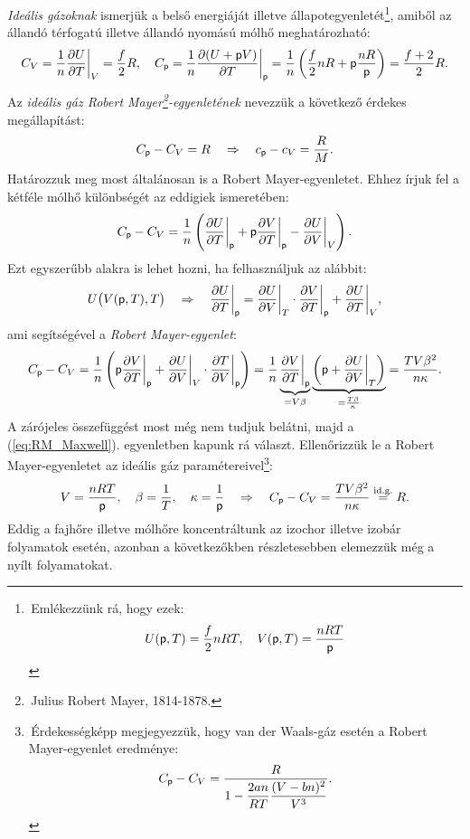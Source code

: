 \emph{Ideális gázoknak} ismerjük a belső energiáját illetve állapotegyenletét\footnote{\,Emlékezzünk rá, hogy ezek:\begin{align}
    U(\mathsf p,T) = \frac f2 nRT,\quad V(\mathsf p,T) = \frac{nRT}{\mathsf p}
\end{align}}, amiből az állandó térfogatú illetve állandó nyomású mólhő meghatározható:
\begin{align}\label{eq:cv_cp}
    C_V = \frac{1}{n} \frac{\partial{U}}{\partial{T}}\bigg|_V = \frac f2 R,\quad C_\mathsf p = \frac{1}{n} \frac{\partial{(U+\mathsf pV)}}{\partial{T}}\bigg|_\mathsf p = \frac{1}{n}\left({\frac f2 nR+ \mathsf p\frac{nR}{\mathsf p}}\right) = \frac{f+2}{2}R.
\end{align} 
Az \emph{ideális gáz Robert Mayer\footnote{\,Julius Robert Mayer, 1814-1878.}-egyenletének} nevezzük a következő érdekes megállapítást:
\begin{align}
    C_\mathsf p - C_V =R \quad\Rightarrow\quad c_\mathsf p - c_V = \frac RM.
\end{align}
Határozzuk meg most általánosan is a Robert Mayer-egyenletet.
Ehhez írjuk fel a kétféle mólhő különbségét az eddigiek ismeretében:
\begin{align}
    C_\mathsf p - C_V = \frac{1}{n}\left({\frac{\partial{U}}{\partial{T}}\bigg|_\mathsf p + \mathsf p \frac{\partial{V}}{\partial{T}}\bigg|_\mathsf p - \frac{\partial{U}}{\partial{V}}\bigg|_V}\right).
\end{align}
Ezt egyszerűbb alakra is lehet hozni, ha felhasználjuk az alábbit:
\begin{align}
    U\big(V(\mathsf p,T),T \big) \quad\Rightarrow\quad \frac{\partial{U}}{\partial{T}}\bigg|_\mathsf p = \frac{\partial{U}}{\partial{V}}\bigg|_T\cdot\frac{\partial{V}}{\partial{T}}\bigg|_\mathsf p + \frac{\partial{U}}{\partial{T}}\bigg|_V,
\end{align}
ami segítségével a \emph{Robert Mayer-egyenlet}:
\begin{align}\label{eq:RM}
    C_\mathsf p -C_V = \frac{1}{n}\left({\mathsf p\frac{\partial{V}}{\partial{T}}\bigg|_\mathsf p + \frac{\partial{U}}{\partial{V}}\bigg|_V\cdot \frac{\partial{T}}{\partial{V}}\bigg|_\mathsf p}\right) = \frac{1}{n}\underbrace{\frac{\partial{V}}{\partial{T}}\bigg|_\mathsf p}_{=V\beta} \underbrace{\left({\mathsf p + \frac{\partial{U}}{\partial{V}}\bigg|_T}\right)}_{=\frac{T\beta}{\kappa}} = \frac{T V \beta^2}{n\kappa}.
\end{align}
A zárójeles összefüggést most még nem tudjuk belátni, majd a (\ref{eq:RM_Maxwell}). egyenletben kapunk rá választ. Ellenőrizzük le a Robert Mayer-egyenletet az ideális gáz paramétereivel\footnote{\,Érdekességképp megjegyezzük, hogy van der Waals-gáz esetén a Robert Mayer-egyenlet eredménye: $$C_\mathsf p-C_V = \frac{R}{1-\dfrac{2an}{RT}\dfrac{(V-bn)^2}{V^3}}.$$}:
\begin{align}
    V = \frac{nRT}{\mathsf p},\quad \beta = \frac{1}{T},\quad \kappa = \frac{1}{\mathsf p} \quad\Rightarrow\quad C_\mathsf p-C_V = \frac{T V \beta^2}{n\kappa} \stackrel{\textnormal{id.g.}}= R. 
\end{align}
Eddig a fajhőre illetve mólhőre koncentráltunk az izochor illetve izobár folyamatok esetén, azonban a következőkben részletesebben elemezzük még a nyílt folyamatokat.

